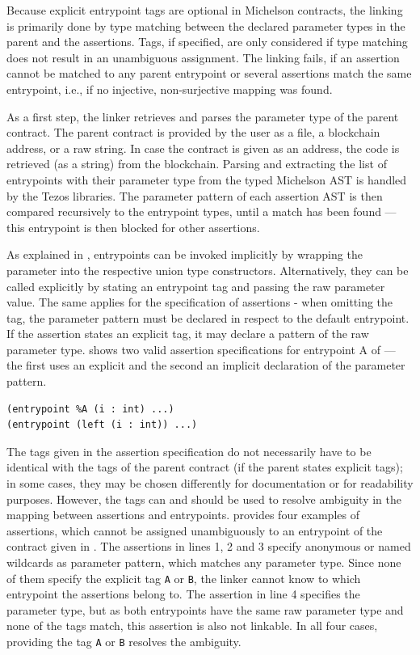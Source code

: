 Because explicit entrypoint tags are optional in Michelson contracts, the linking is primarily done by type matching between the declared parameter types in the parent and the assertions. Tags, if specified, are only considered if type matching does not result in an unambiguous assignment. The linking fails, if an assertion cannot be matched to any parent entrypoint or several assertions match the same entrypoint, i.e., if no injective, non-surjective mapping was found. 

As a first step, the linker retrieves and parses the parameter type of the parent contract. The parent contract is provided by the user as a file, a blockchain address, or a raw string. In case the contract is given as an address, the code is retrieved (as a string) from the blockchain. Parsing and extracting the list of entrypoints with their parameter type from the typed Michelson AST is handled by the Tezos libraries. The parameter pattern of each assertion AST is then compared recursively to the entrypoint types, until a match has been found --- this entrypoint is then blocked for other assertions.

As explained in , entrypoints can be invoked implicitly by wrapping the parameter into the respective union type constructors. Alternatively, they can be called explicitly by stating an entrypoint tag and passing the raw parameter value. The same applies for the specification of assertions - when omitting the tag, the parameter pattern must be declared in respect to the default entrypoint. If the assertion states an explicit tag, it may declare a pattern of the raw parameter type.  shows two valid assertion specifications for entrypoint A of  --- the first uses an explicit and the second an implicit declaration of the parameter pattern. 
\begin{lstlisting}[language=Assertion, numbers=none, caption=Explicit and implicit assertion specification, label=lst:impl_expl]
(entrypoint %A (i : int) ...)
(entrypoint (left (i : int)) ...)
\end{lstlisting}

The tags given in the assertion specification do not necessarily have to be identical with the tags of the parent contract (if the parent states explicit tags); in some cases, they may be chosen differently for documentation or for readability purposes. However, the tags can and should be used to resolve ambiguity in the mapping between assertions and entrypoints.  provides four examples of assertions, which cannot be assigned unambiguously to an entrypoint of the contract given in . The assertions in lines 1, 2 and 3 specify anonymous or named wildcards as parameter pattern, which matches any parameter type. Since none of them specify the explicit tag \texttt{A} or \texttt{B}, the linker cannot know to which entrypoint the assertions belong to. The assertion in line 4 specifies the parameter type, but as both entrypoints have the same raw parameter type and none of the tags match, this assertion is also not linkable. In all four cases, providing the tag \texttt{A} or \texttt{B} resolves the ambiguity.

